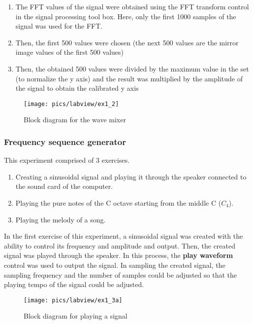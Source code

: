 \begin{enumerate}
	\item The FFT values of the signal were obtained using the FFT transform control in the signal processing tool box. Here, only the first 1000 samples of the signal was used for the FFT.
	\item Then, the first 500 values were chosen (the next 500 values are the mirror image values of the first 500 values)
	\item Then, the obtained 500 values were divided by the maximum value in the set (to normalize the y axis) and the result was multiplied by the amplitude of the signal to obtain the calibrated y axis
\end{enumerate} 

\pagebreak

\begin{figure}[!h]
	\centering
	\texttt{[image: pics/labview/ex1\_2]}
	\caption{Block diagram for the wave mixer}
	\label{fig:ex2}
\end{figure}

\subsubsection{Frequency sequence generator}

This experiment comprised of 3 exercises.
\begin{enumerate}
	\item Creating a sinusoidal signal and playing it through the speaker connected to the sound card of the computer.
	\item Playing the pure notes of the C octave starting from the middle C ($C_{4}$). 
	\item Playing the melody of a song.
\end{enumerate}

\noindent
In the first exercise of this experiment, a sinusoidal signal was created with the ability to control its frequency and amplitude and output. Then, the created  signal was played through the speaker. In this process, the \textbf{play waveform} control was used to output the signal. In sampling the created signal, the sampling frequency and the number of samples could be adjusted so that the playing tempo of the signal could be adjusted. 

\begin{figure}[!h]
	\centering
	\texttt{[image: pics/labview/ex1\_3a]}
	\caption{Block diagram for playing a signal}
	\label{fig:ex3}
\end{figure}

